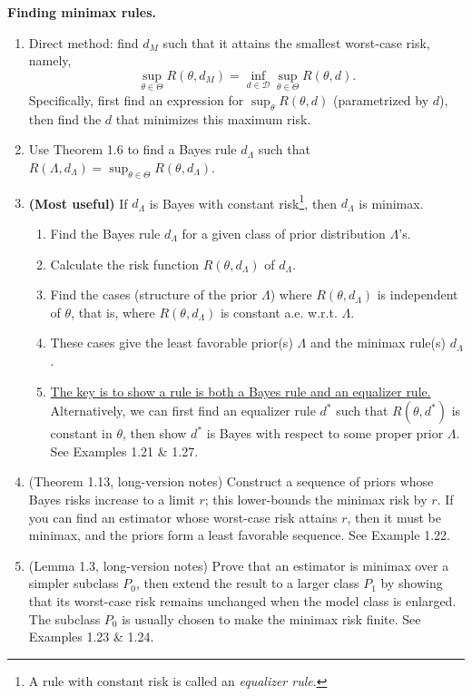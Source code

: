 \begin{mybox}
    \textbf{Finding minimax rules.}
    \begin{enumerate}
        \item Direct method: find $d_M$ such that it attains the smallest worst-case risk, namely,
        \[
        \sup_{\theta \in \Theta} R(\theta, d_M) = \inf_{d \in \mathcal{D}} \sup_{\theta \in \Theta} R(\theta, d).
        \]
        Specifically, first find an expression for $\sup_\theta R(\theta, d)$ (parametrized by $d$), then find the $d$ that minimizes this maximum risk.
        \item Use Theorem 1.6 to find a Bayes rule $d_\Lambda$ such that $R(\Lambda, d_\Lambda) = \sup_{\theta \in \Theta} R(\theta, d_\Lambda).$
        \item \textbf{(Most useful)} If $d_\Lambda$ is Bayes with constant risk\footnote{A rule with constant risk is called an \emph{equalizer rule}.}, then $d_\Lambda$ is minimax.
        \begin{enumerate}[leftmargin=48pt]
            \item[Step 1:] Find the Bayes rule $d_\Lambda$ for a given class of prior distribution $\Lambda$'s.
            \item[Step 2:] Calculate the risk function $R(\theta, d_\Lambda)$ of $d_\Lambda$.
            \item[Step 3:] Find the cases (structure of the prior $\Lambda$) where $R(\theta, d_\Lambda)$ is independent of $\theta$, that is, where $R(\theta, d_\Lambda)$ is constant a.e. w.r.t. $\Lambda$.
            \item[Step 4:] These cases give the least favorable prior(s) $\Lambda$ and the minimax rule(s) $d_\Lambda$.
            \item[Remark:] \underline{The key is to show a rule is both a Bayes rule and an equalizer rule.} Alternatively, we can first find an equalizer rule $d^*$ such that $R(\theta, d^*)$ is constant in $\theta$, then show $d^*$ is Bayes with respect to some proper prior $\Lambda$. See Examples 1.21 \& 1.27.
        \end{enumerate}
        \item (Theorem 1.13, long-version notes) Construct a sequence of priors whose Bayes risks increase to a limit $r$; this lower-bounds the minimax risk by $r$. If you can find an estimator whose worst-case risk attains $r$, then it must be minimax, and the priors form a least favorable sequence. See Example 1.22.
        \item (Lemma 1.3, long-version notes) Prove that an estimator is minimax over a simpler subclass $P_0$, then extend the result to a larger class $P_1$ by showing that its worst-case risk remains unchanged when the model class is enlarged.
        The subclass $P_0$ is usually chosen to make the minimax risk finite.
        See Examples 1.23 \& 1.24.
    \end{enumerate}
\end{mybox}


